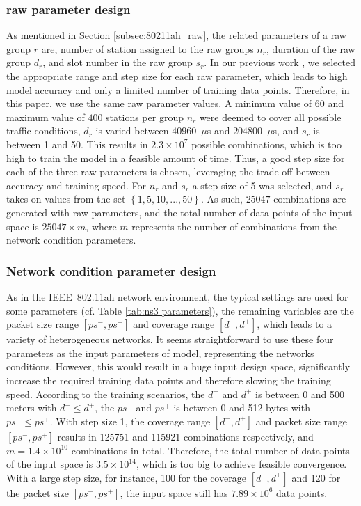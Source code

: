 \subsubsection{\gls{raw} parameter design \label{subsec:raw_para_design}}

As mentioned in Section \ref{subsec:80211ah_raw}, the related parameters of a \gls{raw} group $r$ are, number of station assigned to the \gls{raw} groups $n_r$, duration of the \gls{raw} group $d_r$, and slot number in the \gls{raw} group $s_r$. In our previous work \cite{wowmom2018}, we selected the appropriate range and step size for each \gls{raw} parameter, which leads to high model accuracy and only a limited number of training data points. Therefore, in this paper, we use the same \gls{raw} parameter values. A minimum value of $60$ and maximum value of $400$ stations per group $n_r$ were deemed to cover all possible traffic conditions, $d_r$ is varied between $40960$~$\mu$s and $204800$~$\mu$s, and  $s_r$ is between 1 and 50. This results in $2.3 \times 10^7$ possible combinations, which is too high to train the model in a feasible amount of time. Thus, a good step
size for each of the three \gls{raw} parameters is chosen, leveraging the trade-off between accuracy and training speed.
For $n_r$ and $s_r$ a step size of 5 was selected, and $s_r$ takes on values from the set $\left\{1, 5, 10, ..., 50\right\}$. As such, $25047$ combinations are generated with \gls{raw} parameters, and the total number of data points of the input space is $25047 \times m$, where $m$ represents the number of combinations from the network condition parameters.

\subsubsection{Network condition parameter design \label{subsec:network_para_design}}

As in the IEEE~802.11ah network environment, the typical settings are used for  some parameters (cf. Table \ref{tab:ns3 parameters}), the remaining variables are the  packet size  range $[ps^-, ps^+]$ and coverage range $[d^-, d^+]$, which leads to a variety of heterogeneous networks. It seems straightforward to use these four parameters as the input parameters of model, representing the networks conditions. However, this would result in a huge input design space, significantly increase the required training data points and therefore slowing the training speed. According to the training scenarios, the $d^-$ and $d^+$ is between 0 and 500 meters with $d^- \leq d^+$, the $ps^-$ and $ps^+$ is between 0 and 512 bytes with $ps^- \leq ps^+$. With step size 1, the coverage range $[d^-, d^+]$ and packet size range $[ps^-, ps^+]$ results in 125751 and 115921 combinations respectively, and $m = 1.4 \times 10^{10} $ combinations in total. Therefore, the total number of data points of the input space is $3.5 \times  10^{14}$, which is too big to achieve feasible convergence. With a large step size, for instance, 100 for  the coverage $[d^-, d^+]$ and 120 for the packet size $[ps^-, ps^+]$, the input space still has $7.89 \times  10^{6}$ data points.


